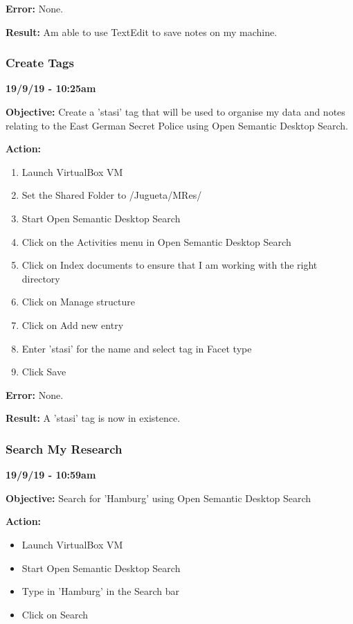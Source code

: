 \documentclass{article}
\begin{document}
\textbf{Error:} None.

\textbf{Result:} Am able to use TextEdit to save notes on my machine.

\subsubsection{Create Tags}

\textbf{19/9/19 - 10:25am}

\textbf{Objective:} Create a 'stasi' tag that will be used to organise my data and notes relating to the East German Secret Police using Open Semantic Desktop Search.

\textbf{Action:}
\begin{enumerate}
    \item Launch VirtualBox VM
    \item Set the Shared Folder to /Jugueta/MRes/
    \item Start Open Semantic Desktop Search
    \item Click on the Activities menu in Open Semantic Desktop Search
    \item Click on Index documents to ensure that I am working with the right directory
    \item Click on Manage structure
    \item Click on Add new entry
    \item Enter 'stasi' for the name and select tag in Facet type
    \item Click Save
\end{enumerate}

\textbf{Error:} None.

\textbf{Result:} A 'stasi' tag is now in existence.

\subsubsection{Search My Research}

\textbf{19/9/19 - 10:59am}

\textbf{Objective:} Search for 'Hamburg' using Open Semantic Desktop Search

\textbf{Action:}
\begin{itemize}
    \item Launch VirtualBox VM
    \item Start Open Semantic Desktop Search
    \item Type in 'Hamburg' in the Search bar
    \item Click on Search
\end{itemize}
\end{document}
